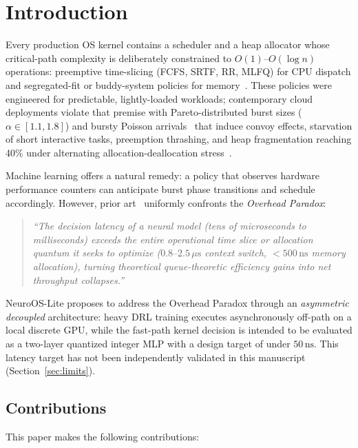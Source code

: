 \section{Introduction}
\label{sec:intro}

Every production OS kernel contains a scheduler and a heap allocator whose
critical-path complexity is deliberately constrained to $O(1)$--$O(\log n)$
operations: preemptive time-slicing (FCFS, SRTF, RR, MLFQ) for CPU dispatch
and segregated-fit or buddy-system policies for memory~\cite{Arpaci2018}.
These policies were engineered for predictable, lightly-loaded workloads;
contemporary cloud deployments violate that premise with Pareto-distributed
burst sizes ($\alpha \in [1.1, 1.8]$) and bursty Poisson arrivals~\cite{Tsafrir2007}
that induce convoy effects, starvation of short interactive tasks, preemption
thrashing, and heap fragmentation reaching 40\% under
alternating allocation-deallocation
stress~\cite{Wilson1995,Johnstone1998}.

Machine learning offers a natural remedy: a policy that observes hardware
performance counters can anticipate burst phase transitions and schedule
accordingly. However, prior art~\cite{Mao2019}
uniformly confronts the \emph{Overhead Paradox}:

\begin{quote}
\textit{``The decision latency of a neural model (tens of microseconds to
milliseconds) exceeds the entire operational time slice or allocation quantum
it seeks to optimize ($0.8\text{--}2.5\,\mu\text{s}$ context switch,
$<500\,\text{ns}$ memory allocation), turning theoretical queue-theoretic
efficiency gains into net throughput collapses.''}
\end{quote}

NeuroOS-Lite proposes to address the Overhead Paradox through an \textit{asymmetric
decoupled} architecture: heavy DRL training executes asynchronously off-path on
a local discrete GPU, while the fast-path kernel decision is intended to be
evaluated as a two-layer quantized integer MLP with a design target of under
$50\,\text{ns}$. This latency target has not been independently validated in
this manuscript (Section~\ref{sec:limits}).

\subsection*{Contributions}

This paper makes the following contributions:

